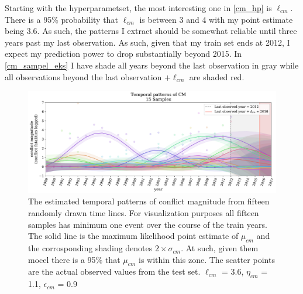 \documentclass[a4paper]{article}
\begin{document}
Starting with the hyperparametset, the most interesting one in \autoref{cm_hp} is $\ell_{cm}$. There is a 95\% probability that $\ell_{cm}$ is between 3 and 4 with my point estimate being 3.6. As such, the patterns I extract should be somewhat reliable until three years past my last observation. As such, given that my train set ends at 2012, I expect my prediction power to drop substantially beyond 2015. In \autoref{cm_sampel_eks} I have shade all years beyond the last observation in gray while all observations beyond the last observation $+\ell_{cm}$ are shaded red.\par



\begin{figure}[!htb]
	\centering
	\includegraphics[scale=0.47]{cm_15_samples.pdf}
    \caption{\footnotesize{The estimated temporal patterns of conflict magnitude from fifteen randomly drawn time lines. For visualization purposes all fifteen samples has minimum one event over the course of the train years. The solid line is the maximum likelihood point estimate of $\mu_{cm}$ and the corrosponding shading denotes $2\times\sigma_{cm}$. At such, given them mocel there is a 95\% that $\mu_{cm}$ is within this zone. The scatter points are the actual observed values from the test set. $\ell_{cm}$ = 3.6, $\eta_{cm}$ = 1.1, $\epsilon_{cm}$ = 0.9}\label{cm_sampel_eks}}
\end{figure}
\end{document}

